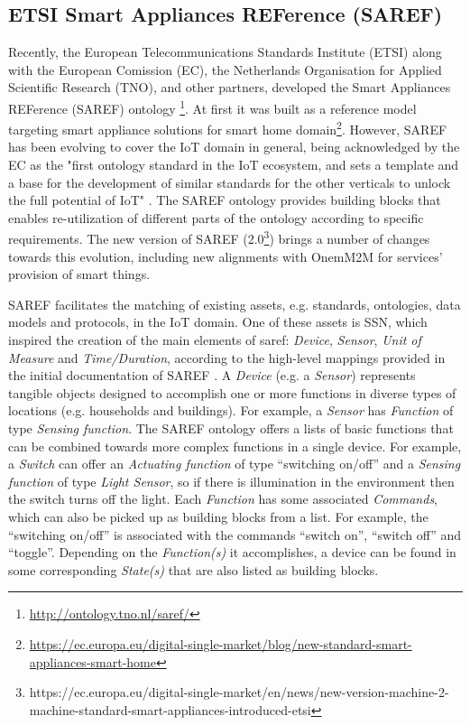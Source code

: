 \documentclass{sig-alternate-05-2015}
\begin{document}

\subsection{ETSI Smart Appliances REFerence (SAREF)}
Recently, the European Telecommunications Standards Institute (ETSI) along with the European Comission (EC), the Netherlands Organisation for Applied Scientific Research (TNO), and other partners, developed the Smart Appliances REFerence (SAREF) ontology \cite{Daniele2015,Daniele2016}\footnote{\url{http://ontology.tno.nl/saref/}}. At first it was built as a reference model targeting smart appliance solutions for smart home domain\footnote{\url{https://ec.europa.eu/digital-single-market/blog/new-standard-smart-appliances-smart-home}}. However, SAREF has been evolving to cover the IoT domain in general, being acknowledged by the EC as the "first ontology standard in the IoT ecosystem, and sets a template and a base for the development of similar standards for the other verticals to unlock the full potential of IoT" \cite{Daniele2016b}. The SAREF ontology provides building blocks that enables re-utilization of different parts of the ontology according to specific requirements. The new version of SAREF (2.0\footnote{https://ec.europa.eu/digital-single-market/en/news/new-version-machine-2-machine-standard-smart-appliances-introduced-etsi}) brings a number of changes towards this evolution, including new alignments with OnemM2M for services' provision of smart things. 

SAREF facilitates the matching of existing assets, e.g. standards, ontologies, data models and protocols, in the IoT domain. One of these assets is SSN, which inspired the creation of the main elements of saref:\- \textit{Device}, \textit{Sensor}, \textit{Unit of Measure} and \textit{Time/Duration}, according to the high-level mappings provided in the initial documentation of SAREF \cite{Daniele2015}. A \textit{Device} (e.g. a \textit{Sensor}) represents tangible objects designed to accomplish one or more functions in diverse types of locations (e.g. households and buildings). For example, a \textit{Sensor} has \textit{Function} of type \textit{Sensing function}. The SAREF ontology offers a lists of basic functions that can be combined towards more complex functions in a single device. For example, a \textit{Switch} can offer an \textit{Actuating function} of type “switching on/off” and a \textit{Sensing function} of type \textit{Light Sensor}, so if there is illumination in the environment then the switch turns off the light. Each \textit{Function} has some associated \textit{Commands}, which can also be picked up as building blocks from a list. For example, the “switching on/off” is associated with the commands “switch on”, “switch off” and “toggle”. Depending on the \textit{Function(s)} it accomplishes, a device can be found in some corresponding \textit{State(s)} that are also listed as building blocks. 
\end{document}
